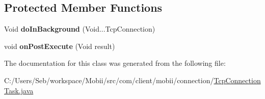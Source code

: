 \subsection*{Protected Member Functions}
\begin{DoxyCompactItemize}
\item 
\hypertarget{classcom_1_1client_1_1mobii_1_1connection_1_1_tcp_connection_task_aaade7b4a7dfabeafa79ef9cbcc3d3e1a}{Void {\bfseries do\-In\-Background} (Void...\-Tcp\-Connection)}\label{classcom_1_1client_1_1mobii_1_1connection_1_1_tcp_connection_task_aaade7b4a7dfabeafa79ef9cbcc3d3e1a}

\item 
\hypertarget{classcom_1_1client_1_1mobii_1_1connection_1_1_tcp_connection_task_a6b982060b5b53ad8242948825c15908a}{void {\bfseries on\-Post\-Execute} (Void result)}\label{classcom_1_1client_1_1mobii_1_1connection_1_1_tcp_connection_task_a6b982060b5b53ad8242948825c15908a}

\end{DoxyCompactItemize}


The documentation for this class was generated from the following file\-:\begin{DoxyCompactItemize}
\item 
C\-:/\-Users/\-Seb/workspace/\-Mobii/src/com/client/mobii/connection/\hyperlink{_tcp_connection_task_8java}{Tcp\-Connection\-Task.\-java}\end{DoxyCompactItemize}
